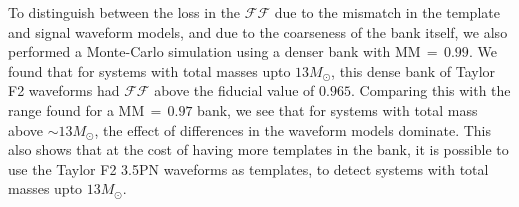 \documentclass[aps,
prd,
amsmath,
amssymb,
twocolumn,
floatfix,
groupedaddress]{revtex4-1}
\newcommand{\FF}{\mathcal{FF}}
\newcommand{\MM}{\mathrm{MM}}
\begin{document}
To distinguish between the loss in the $\FF$ due to the mismatch in the template and signal waveform models, and due to the coarseness of the bank itself, we also performed a Monte-Carlo simulation using a denser bank with $\MM\,=\,0.99$. We found that for systems with total masses upto $13M_{\odot}$, this dense bank of Taylor F2 waveforms had $\FF$ above the fiducial value of $0.965$. Comparing this with the range found for a $\MM\,=\,0.97$ bank, we see that for systems with total mass above $\sim 13M_{\odot}$, the effect of differences in the waveform models dominate. This also shows that at the cost of having more templates in the bank, it is possible to use the Taylor F2 3.5PN waveforms as templates, to detect systems with total masses upto $13M_{\odot}$. 


%
\end{document}
